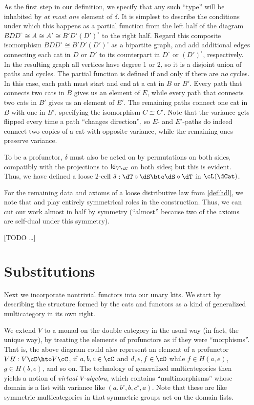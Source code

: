 \documentclass{amsart}
\let\oc\circ
\newcommand{\C}{\cC}
\newcommand{\D}{\cD}
\newcommand{\hunit}[1]{\Id_{#1}}
\newcommand{\dl}{\delta}
\renewcommand{\o}{^{\circ}}
\newcommand{\Id}{\mathsf{Id}}
\begin{document}
As the first step in our definition, we specify that any such ``type'' will be inhabited by \emph{at most one} element of $\dl$.
It is simplest to describe the conditions under which this happens as a partial function from the left half of the diagram $B D D\o \cong A\cong A' \cong B' D' (D')\o$ to the right half.
Regard this composite isomorphism $B D D\o \cong B' D' (D')\o$ as a bipartite graph, and add additional edges connecting each cat in $D$ or $D'$ to its counterpart in $D\o$ or $(D')\o$, respectively.
In the resulting graph all vertices have degree 1 or 2, so it is a disjoint union of paths and cycles.
The partial function is defined if and only if there are \emph{no} cycles.
In this case, each path must start and end at a cat in $B$ or $B'$.
Every path that connects two cats in $B$ gives us an element of $E$, while every path that connects two cats in $B'$ gives us an element of $E'$.
The remaining paths connect one cat in $B$ with one in $B'$, specifying the isomorphism $C\cong C'$.
Note that the variance gets flipped every time a path ``changes direction'', so $E$- and $E'$-paths do indeed connect two copies of a cat with opposite variance, while the remaining ones preserve variance.

To be a profunctor, $\dl$ must also be acted on by permutations on both sides, compatibly with the projections to $\hunit{V\C}$ on both sides; but this is evident.
Thus, we have defined a loose 2-cell $\dl : \dT \oc \dS \bto \dS \oc \dT$ in $\cL(\dCat)$.

For the remaining data and axioms of a loose distributive law from \cref{def:hdl}, we note that \dT and \dS play entirely symmetrical roles in the construction.
Thus, we can cut our work almost in half by symmetry (``almost'' because two of the axioms are self-dual under this symmetry).

[TODO \dots]


\section{Substitutions}
\label{sec:substitutions}

Next we incorporate nontrivial functors into our unary kits.
We start by describing the structure formed by the cats and functors as a kind of generalized multicategory in its own right.

We extend $V$ to a monad on the double category \dCat in the usual way (in fact, the unique way), by treating the elements of profunctors as if they were ``morphisms''.
That is, the above diagram could also represent an element of a profunctor $V H : V \D \hto V \C$, if $a,b,c\in\C$ and $d,e,f\in \D$ while $f\in H(a,e)$, $g\in H(b,e)$, and so on.
The technology of generalized multicategories then yields a notion of \emph{virtual $V$-algebra}, which contains ``multimorphisms'' whose domain is a list with variance like $(a,b\o,b,c\o,a)$.
Note that these are like symmetric multicategories in that symmetric groups act on the domain lists.
\end{document}
